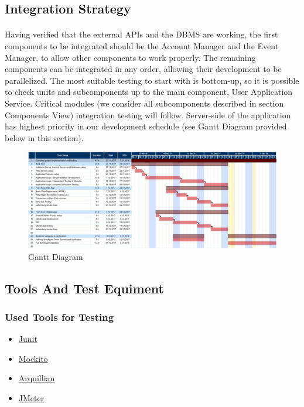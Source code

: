 \documentclass{article}
\begin{document}
		\subsection{Integration Strategy}
		\paragraph{}Having verified that the external APIs and the DBMS are working, the first components to be integrated should be the Account Manager and the Event Manager, to allow other components to work properly. The remaining components can be integrated in any order, allowing their development to be parallelized. The most suitable testing to start with  is bottom-up, so it is possible to check units and subcomponents up to the main component, User Application Service. Critical modules (we consider all subcomponents described in section Components View) integration testing will follow. Server-side of the application has highest priority in our development schedule (see Gantt Diagram provided below in this section).
			\begin{figure}[H]
			\includegraphics[width=\linewidth]{Images/Gantt_Diagram.jpg}
			\caption{Gantt Diagram}
			\label{Gantt}
			\end{figure}
		\newpage
		\subsection{Tools And Test Equiment}
			\subsubsection{Used Tools for Testing}
			\begin{itemize}
			\item{}\href{http://junit.org/junit5/}{Junit}
			\item{}\href{http://site.mockito.org/}{Mockito}
			\item{}\href{http://arquillian.org/}{Arquillian}
			\item{}\href{http://jmeter.apache.org/}{JMeter}
			\end{itemize}
\end{document}
